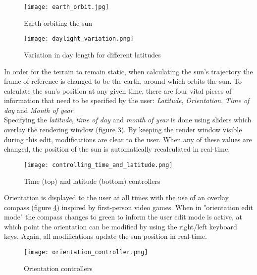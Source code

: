 \begin{figure}
\center
	\texttt{[image: earth\_orbit.jpg]}
	\caption{ Earth orbiting the sun \protect\footnotemark}
	\label{fig:earth_orbit}
\end{figure}

\begin{figure}
\center
	\texttt{[image: daylight\_variation.png]}
	\caption{ Variation in day length for different latitudes \protect\footnotemark}
	\label{fig:daylight_variation}
\end{figure}

In order for the terrain to remain static, when calculating the sun's trajectory the frame of reference is changed to be the earth, around which orbits the sun. To calculate the sun's position at any given time, there are four vital pieces of information that need to be specified by the user: \textit{Latitude}, \textit{Orientation}, \textit{Time of day} and \textit{Month of year}. \\

Specifying the \textit{latitude}, \textit{time of day} and \textit{month of year} is done using sliders which overlay the rendering window (figure \ref{fig:lat_and_time_control}). By keeping the render window visible during this edit, modifications are clear to the user. When any of these values are changed, the position of the sun is automatically recalculated in real-time. \\

\begin{figure}
\center
	\texttt{[image: controlling\_time\_and\_latitude.png]}
	\caption{ Time (top) and latitude (bottom) controllers }
	\label{fig:lat_and_time_control}
\end{figure}

Orientation is displayed to the user at all times with the use of an overlay compass (figure \ref{fig:orientation_control}) inspired by first-person video games. When in "orientation edit mode" the compass changes to green to inform the user edit mode is active, at which point the orientation can be modified by using the right/left keyboard keys. Again, all modifications update the sun position in real-time.\\

\begin{figure}
\center
	\texttt{[image: orientation\_controller.png]}
	\caption{ Orientation controllers}
	\label{fig:orientation_control}
\end{figure}

